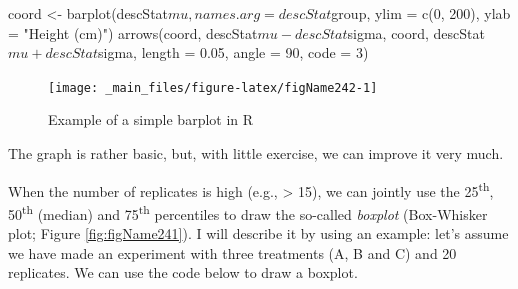 \documentclass[a4paper,12pt,oneside]{book}
\newenvironment{Shaded}{\begin{snugshade}}{\end{snugshade}}
\newcommand{\DecValTok}[1]{#1}
\newcommand{\FloatTok}[1]{#1}
\newcommand{\SpecialCharTok}[1]{#1}
\newcommand{\StringTok}[1]{#1}
\newcommand{\OtherTok}[1]{#1}
\newcommand{\FunctionTok}[1]{#1}
\newcommand{\AttributeTok}[1]{#1}
\newcommand{\NormalTok}[1]{#1}
\begin{document}
\begin{Shaded}
\begin{Highlighting}[]
\NormalTok{coord }\OtherTok{\textless{}{-}} \FunctionTok{barplot}\NormalTok{(descStat}\SpecialCharTok{$}\NormalTok{mu, }\AttributeTok{names.arg =}\NormalTok{ descStat}\SpecialCharTok{$}\NormalTok{group, }
                 \AttributeTok{ylim =} \FunctionTok{c}\NormalTok{(}\DecValTok{0}\NormalTok{, }\DecValTok{200}\NormalTok{), }\AttributeTok{ylab =} \StringTok{"Height (cm)"}\NormalTok{)}
\FunctionTok{arrows}\NormalTok{(coord, descStat}\SpecialCharTok{$}\NormalTok{mu }\SpecialCharTok{{-}}\NormalTok{ descStat}\SpecialCharTok{$}\NormalTok{sigma, }
\NormalTok{       coord, descStat}\SpecialCharTok{$}\NormalTok{mu }\SpecialCharTok{+}\NormalTok{ descStat}\SpecialCharTok{$}\NormalTok{sigma, }
       \AttributeTok{length =} \FloatTok{0.05}\NormalTok{, }\AttributeTok{angle =} \DecValTok{90}\NormalTok{, }\AttributeTok{code =} \DecValTok{3}\NormalTok{)}
\end{Highlighting}
\end{Shaded}

\begin{figure}

{\centering \texttt{[image: \_main\_files/figure-latex/figName242-1]} 

}

\caption{Example of a simple barplot in R}\label{fig:figName242}
\end{figure}

The graph is rather basic, but, with little exercise, we can improve it very much.

When the number of replicates is high (e.g., \textgreater{} 15), we can jointly use the 25\textsuperscript{th}, 50\textsuperscript{th} (median) and 75\textsuperscript{th} percentiles to draw the so-called \emph{boxplot} (Box-Whisker plot; Figure \ref{fig:figName241}). I will describe it by using an example: let's assume we have made an experiment with three treatments (A, B and C) and 20 replicates. We can use the code below to draw a boxplot.
\end{document}

